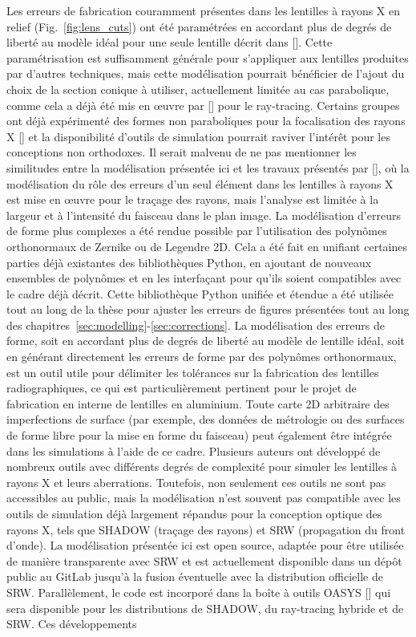 \begin{refsection}
Les erreurs de fabrication couramment présentes dans les lentilles à rayons X en relief (Fig.~\ref{fig:lens_cuts}) ont été paramétrées en accordant plus de degrés de liberté au modèle idéal pour une seule lentille décrit dans [\cite{Baltser2011}]. Cette paramétrisation est suffisamment générale pour s'appliquer aux lentilles produites par d'autres techniques, mais cette modélisation pourrait bénéficier de l'ajout du choix de la section conique à utiliser, actuellement limitée au cas parabolique, comme cela a déjà été mis en œuvre par [\cite{SanchezdelRio2012,Andrejczuk2010}] pour le ray-tracing. Certains groupes ont déjà expérimenté des formes non paraboliques pour la focalisation des rayons X [\cite{Alianelli2007,Evans-Lutterodt2003, Alianelli2015, Sutter2017}] et la disponibilité d'outils de simulation pourrait raviver l'intérêt pour les conceptions non orthodoxes. Il serait malvenu de ne pas mentionner les similitudes entre la modélisation présentée ici et les travaux présentés par [\cite{Andrejczuk2010}], où la modélisation du rôle des erreurs d'un seul élément dans les lentilles à rayons X est mise en œuvre pour le traçage des rayons, mais l'analyse est limitée à la largeur et à l'intensité du faisceau dans le plan image. La modélisation d'erreurs de forme plus complexes a été rendue possible par l'utilisation des polynômes orthonormaux de Zernike ou de Legendre 2D. Cela a été fait en unifiant certaines parties déjà existantes des bibliothèques Python, en ajoutant de nouveaux ensembles de polynômes et en les interfaçant pour qu'ils soient compatibles avec le cadre déjà décrit. Cette bibliothèque Python unifiée et étendue a été utilisée tout au long de la thèse pour ajuster les erreurs de figures présentées tout au long des chapitres~\ref{sec:modelling}-\ref{sec:corrections}. La modélisation des erreurs de forme, soit en accordant plus de degrés de liberté au modèle de lentille idéal, soit en générant directement les erreurs de forme par des polynômes orthonormaux, est un outil utile pour délimiter les tolérances sur la fabrication des lentilles radiographiques, ce qui est particulièrement pertinent pour le projet de fabrication en interne de lentilles en aluminium. Toute carte 2D arbitraire des imperfections de surface (par exemple, des données de métrologie ou des surfaces de forme libre pour la mise en forme du faisceau) peut également être intégrée dans les simulations à l'aide de ce cadre. Plusieurs auteurs ont développé de nombreux outils avec différents degrés de complexité pour simuler les lentilles à rayons X et leurs aberrations. Toutefois, non seulement ces outils ne sont pas accessibles au public, mais la modélisation n'est souvent pas compatible avec les outils de simulation déjà largement répandus pour la conception optique des rayons X, tels que SHADOW (traçage des rayons) et SRW (propagation du front d'onde). La modélisation présentée ici est open source, adaptée pour être utilisée de manière transparente avec SRW et est actuellement disponible dans un dépôt public au GitLab jusqu'à la fusion éventuelle avec la distribution officielle de SRW. Parallèlement, le code est incorporé dans la boîte à outils OASYS [\cite{Rebuffi2017}] qui sera disponible pour les distributions de SHADOW, du ray-tracing hybride et de SRW. Ces développements 
\end{refsection}
